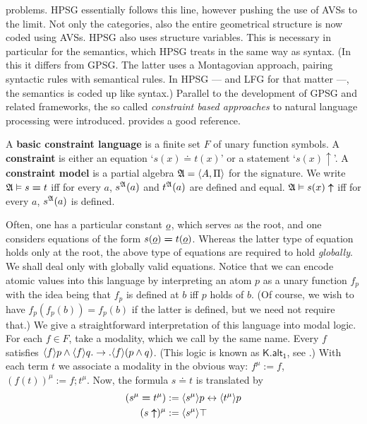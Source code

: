 problems. HPSG essentially follows this line, however pushing the
use of AVSs to the limit. Not only the categories, also the entire
geometrical structure is now coded using AVSs. HPSG also uses
structure variables. This is necessary in particular for the
semantics, which HPSG treats in the same way as syntax. (In this
it differs from GPSG. The latter uses a Montagovian approach,
pairing syntactic rules with semantical rules. In HPSG --- and 
LFG for that matter ---, the semantics is coded up like syntax.) 
Parallel to the development of GPSG and related frameworks, the 
so called {\it constraint based approaches\/} to natural language 
processing were introduced.  \cite{shieber:constraint} provides 
a good reference.
\begin{defn}
A \textbf{basic constraint language} is a finite set $F$ of unary 
function symbols. A \textbf{constraint} is either an equation 
`$s(x) \boldsymbol{\doteq} t(x)$' or a statement `$s(x) \uparrow$'. 
A \textbf{constraint model} is a partial algebra 
$\mathfrak{A} = \langle A, \Pi\rangle$ for the signature.
We write $\mathfrak{A} \vDash s \boldsymbol{=} t$ iff for every $a$,
$s^{\mathfrak{A}}(a)$ and $t^{\mathfrak{A}}(a)$ are defined and equal. $\mathfrak{A} \vDash
s(x)\boldsymbol{\uparrow}$ iff for every $a$, $s^{\mathfrak{A}}(a)$ is defined.
\end{defn}
Often, one has a particular constant $\underline{o}$, which serves as
the root, and one considers equations of the form $s(\underline{o})
\boldsymbol{=} t(\underline{o})$. Whereas the latter type of equation 
holds only at the root, the above type of equations are required to 
hold {\it globally}. We shall deal only with globally valid equations.
Notice that we can encode atomic values into this language by
interpreting an atom $p$ as a unary function $f_p$ with the idea
being that $f_p$ is defined at $b$ iff $p$ holds of
$b$. (Of course, we wish to have $f_p(f_p(b)) = f_p(b)$ if the
latter is defined, but we need not require that.) We give a
straightforward interpretation of this language into modal logic.
For each $f \in F$, take a modality, which we call by the same
name. Every $f$ satisfies $\langle f\rangle p \wedge \langle f\rangle  q . \rightarrow.
\langle f\rangle (p \wedge q)$. (This logic is known as $\mathsf{K.alt_1}$, 
see \cite{kracht:av}.) With each term $t$ we associate a modality in 
the obvious way: $f^{\mu} := f$, $(f(t))^{\mu} := f; t^{\mu}$. Now, 
the formula $s \boldsymbol{\doteq} t$ is translated by
\begin{equation}
\begin{split}
(s^{\mu} \boldsymbol{=} t^{\mu}) & 
	:= \langle s^{\mu}\rangle p \leftrightarrow \langle t^{\mu}\rangle p \\
(s \boldsymbol{\uparrow})^{\mu} & := \langle s^{\mu}\rangle \top
\end{split}
\end{equation}
